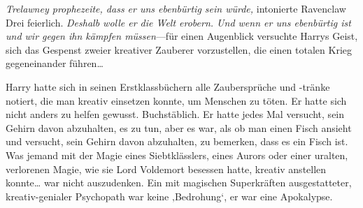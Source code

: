 

\emph{Trelawney prophezeite, dass er uns ebenbürtig sein würde,} intonierte Ravenclaw Drei feierlich. \emph{Deshalb wolle er die Welt erobern. Und wenn er uns ebenbürtig ist und wir gegen ihn kämpfen müssen}—für einen Augenblick versuchte Harrys Geist, sich das Gespenst zweier kreativer Zauberer vorzustellen, die einen totalen Krieg gegeneinander führen…

Harry hatte sich in seinen Erstklassbüchern alle Zaubersprüche und -tränke notiert, die man kreativ einsetzen konnte, um Menschen zu töten. Er hatte sich nicht anders zu helfen gewusst. Buchstäblich. Er hatte jedes Mal versucht, sein Gehirn davon abzuhalten, es zu tun, aber es war, als ob man einen Fisch ansieht und versucht, sein Gehirn davon abzuhalten, zu bemerken, dass es ein Fisch ist. Was jemand mit der Magie eines Siebtklässlers, eines Aurors oder einer uralten, verlorenen Magie, wie sie Lord Voldemort besessen hatte, kreativ anstellen konnte… war nicht auszudenken. Ein mit magischen Superkräften ausgestatteter, kreativ-genialer Psychopath war keine ‚Bedrohung‘, er war eine Apokalypse.



